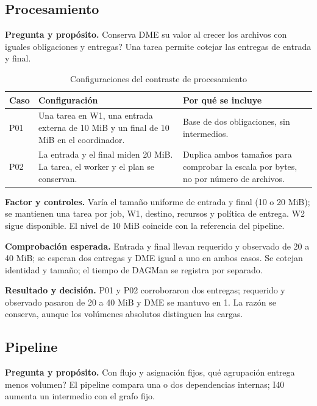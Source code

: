\subsection{Procesamiento}
\label{sec:prueba_p}
\textbf{Pregunta y propósito.} \textquestiondown{}Conserva DME su valor al crecer los archivos con iguales obligaciones y entregas? Una tarea permite cotejar las entregas de entrada y final.

\begin{table}[htbp]\centering\small
\caption{Configuraciones del contraste de procesamiento}
\begin{tabularx}{\linewidth}{@{}P{1.4cm}YY@{}}
\toprule Caso & Configuración & Por qué se incluye\\\midrule
P01 & Una tarea en W1, una entrada externa de 10 MiB y un final de 10 MiB en el coordinador. & Base de dos obligaciones, sin intermedios.\\
P02 & La entrada y el final miden 20 MiB. La tarea, el worker y el plan se conservan. & Duplica ambos tamaños para comprobar la escala por bytes, no por número de archivos.\\
\bottomrule
\end{tabularx}
\end{table}

\textbf{Factor y controles.} Varía el tamaño uniforme de entrada y final (10 o 20 MiB); se mantienen una tarea por job, W1, destino, recursos y política de entrega. W2 sigue disponible. El nivel de 10 MiB coincide con la referencia del pipeline.

\textbf{Comprobación esperada.} Entrada y final llevan requerido y observado de 20 a 40 MiB; se esperan dos entregas y DME igual a uno en ambos casos. Se cotejan identidad y tamaño; el tiempo de DAGMan se registra por separado.

\textbf{Resultado y decisión.} P01 y P02 corroboraron dos entregas; requerido y observado pasaron de 20 a 40 MiB y DME se mantuvo en 1. La razón se conserva, aunque los volúmenes absolutos distinguen las cargas.

\subsection{Pipeline}
\label{sec:prueba_l}
\textbf{Pregunta y propósito.} Con flujo y asignación fijos, \textquestiondown{}qué agrupación entrega menos volumen? El pipeline compara una o dos dependencias internas; I40 aumenta un intermedio con el grafo fijo.

